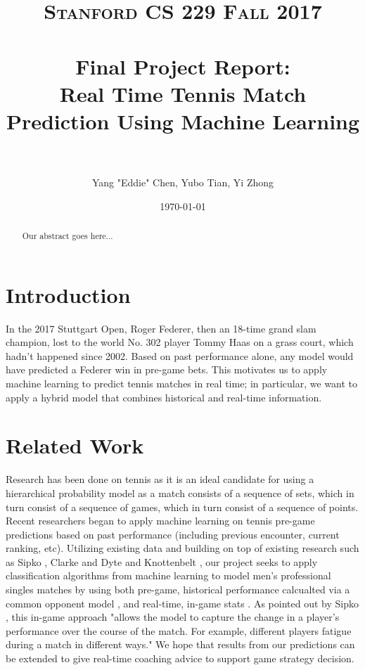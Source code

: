 \documentclass[paper=a4, fontsize=11pt]{scrartcl} %
\title{	
\normalfont \normalsize 
\textsc{Stanford CS 229 Fall 2017} \\ [20pt] %
\horrule{0.5pt} \\[0.4cm] %
\Large Final Project Report: \\
\Large Real Time Tennis Match Prediction Using Machine Learning\\ %
\horrule{2pt} \\[0.5cm] %
}
\author{Yang "Eddie" Chen, Yubo Tian, Yi Zhong} %
\date{\normalsize\today} %
\numberwithin{equation}{section} %
\numberwithin{figure}{section} %
\numberwithin{table}{section} %
\begin{document}
\twocolumn[
\maketitle %
]
\begin{abstract}
Our abstract goes here...
\end{abstract}

\section{Introduction}
In the 2017 Stuttgart Open, Roger Federer, then an 18-time grand slam champion, lost to the world No. 302 player Tommy Haas on a grass court, which hadn't happened since 2002.  Based on past performance alone, any model would have predicted a Federer win in pre-game bets. This motivates us to apply machine learning to predict tennis matches in real time; in particular, we want to apply a hybrid model that combines historical and real-time information.

\section{Related Work}
Research has been done on tennis as it is an ideal candidate for using a hierarchical probability model as a match consists of a sequence of sets, which in turn consist of a sequence of games, which in turn consist of a sequence of points.  Recent researchers began to apply machine learning on tennis pre-game predictions based on past performance (including previous encounter, current ranking, etc). Utilizing existing data and building on top of existing research such as Sipko \cite{tennis1}, Clarke and Dyte \cite{Clarke2010} and Knottenbelt \cite{KNOTTENBELT20123820}, our project seeks to apply classification algorithms from machine learning to model men's professional singles matches by using both pre-game, historical performance calcualted via a common opponent model \cite{KNOTTENBELT20123820}, and real-time, in-game stats \cite{tennis_charting} \cite{tennis2setbyset}. As pointed out by Sipko \cite{tennis1}, this in-game approach "allows the model to capture the change in a player's performance over the course of the match. For example, different players fatigue during a match in different ways." We hope that results from our predictions can be extended to give real-time coaching advice to support game strategy decision.
\end{document}
